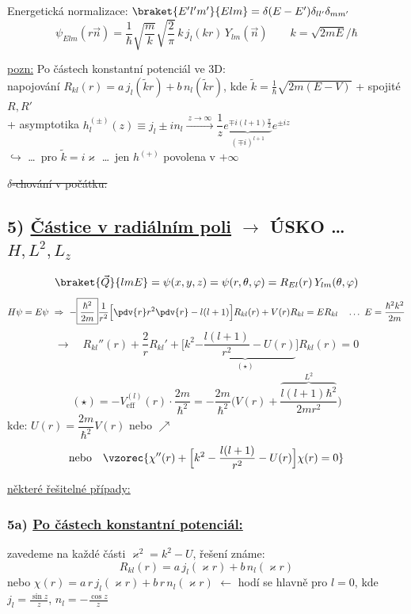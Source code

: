 Energetická normalizace: \quad $\braket{E'l'm'}{Elm} = \delta(E - E')\delta_{ll'}\delta_{mm'}$
\[
  \psi_{Elm}(r\vec n) = \boxed{\frac1\hbar\sqrt{\frac{m}{k}}}\sqrt{\frac2\pi}\,k\,j_l(kr)\,Y_{lm}(\vec n) \qquad k = \sqrt{2mE}/\hbar
\]
\hspace*{3cm} \qquad {}

\underline{pozn:} Po částech konstantní potenciál ve 3D: \\
\quad napojování \quad $R_{kl}(r) = a\,j_l(\tilde kr) + b\,n_l(\tilde kr)$, \quad kde $\tilde k = \frac1\hbar\sqrt{2m(E - V)}$ \quad + spojité $R, R'$ \\
\quad + asymptotika \quad $h_l^{(\pm)}(z) \equiv j_l \pm in_l \xrightarrow{\ z\to\infty\ } \dfrac1z\underbrace{e^{\mp i(l+1)\frac{\pi}{2}}}_{(\mp i)^{l+1}}e^{\pm iz}$ \\
\quad\quad $\hookrightarrow$ \dots\ pro $\tilde k = i\varkappa$ \dots\ jen $h^{(+)}$ povolena v $+\infty$

\sout{$\delta$-chování v počátku:}

\subsection*{5) \underline{Částice v radiálním poli} $\to$ ÚSKO \dots\ $H, L^2, L_z$}
\[
  \braket{\vec Q}{lmE} = \psi(x,y,z) = \psi(r,\theta,\varphi) = R_{El}(r)\,Y_{lm}(\theta,\varphi)
\]
\[
  H\psi = E\psi \ \Rightarrow\ -\boxed{\frac{\hbar^2}{2m}}\frac{1}{r^2}\Big[\pdv{r}r^2\pdv{r} - l(l+1)\Big]R_{kl}(r) + V(r)R_{kl} = ER_{kl}
  \quad\dots\ E = \frac{\hbar^2k^2}{2m}
\]
\[
  \to\quad R_{kl}''(r) + \frac2r R_{kl}' + \Big[k^2\underbrace{- \frac{l(l+1)}{r^2} - U(r)}_{(\star)}\Big]R_{kl}(r) = 0
\]
\[
  (\star) = -V_{\text{eff}}^{(l)}(r)\cdot\frac{2m}{\hbar^2} = -\frac{2m}{\hbar^2}\Big(V(r) + \frac{\overbrace{l(l+1)\hbar^2}^{L^2}}{2mr^2}\Big)
\]
kde: \quad $U(r) = \dfrac{2m}{\hbar^2}V(r)$ \quad nebo $\nearrow$
\[
  \text{nebo}\quad \vzorec{\chi''(r) + \Big[k^2 - \frac{l(l+1)}{r^2} - U(r)\Big]\chi(r) = 0}
\]

\underline{některé řešitelné případy:}
\subsubsection*{5a) \underline{Po částech konstantní potenciál:}}
zavedeme na každé části \quad $\varkappa^2 = k^2 - U$, \quad řešení známe:
\[
  R_{kl}(r) = a\,j_l(\varkappa r) + b\,n_l(\varkappa r)
\]
nebo \quad $\chi(r) = a\,r\,j_l(\varkappa r) + b\,r\,n_l(\varkappa r)$ \quad $\leftarrow$ hodí se hlavně pro $l = 0$, kde $j_l = \frac{\sin z}{z}$, $n_l = -\frac{\cos z}{z}$

